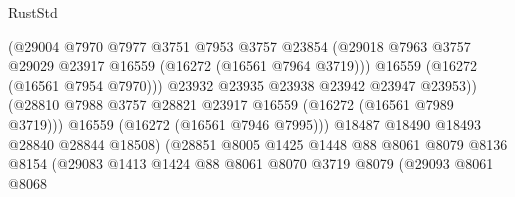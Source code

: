 \begin{lexlean}{RustStd}
\begin{coremodule}
                                        (@29004
                                          @7970
                                          @7977
                                          @3751
                                          @7953
                                          @3757
                                          @23854
                                          (@29018
                                            @7963
                                            @3757
                                            @29029
                                            @23917
                                            @16559
                                            (@16272 (@16561 @7964 @3719)))
                                          @16559
                                          (@16272 (@16561 @7954 @7970)))
                                        @23932
                                        @23935
                                        @23938
                                        @23942
                                        @23947
                                        @23953))
                                    (@28810
                                      @7988
                                      @3757
                                      @28821
                                      @23917
                                      @16559
                                      (@16272 (@16561 @7989 @3719)))
                                    @16559
                                    (@16272 (@16561 @7946 @7995)))
                                  @18487
                                  @18490
                                  @18493
                                  @28840
                                  @28844
                                  @18508)
                                (@28851
                                  @8005
                                  @1425
                                  @1448
                                  @88
                                  @8061
                                  @8079
                                  @8136
                                  @8154
                                  (@29083
                                    @1413
                                    @1424
                                    @88
                                    @8061
                                    @8070
                                    @3719
                                    @8079
                                    (@29093
                                      @8061
                                      @8068

\end{coremodule}
\end{lexlean}
